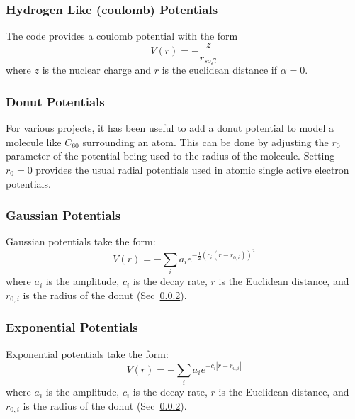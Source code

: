 \documentclass{article}
\begin{document}
\subsubsection{Hydrogen Like (coulomb) Potentials} %
\label{ssub:hydrogen_like}
The code provides a coulomb potential with the form
\begin{equation}
  V(r) = -\frac{z}{r_{soft}}
  \label{eq:H_like}
\end{equation}
where $z$ is the nuclear charge and $r$ is the euclidean distance if $\alpha = 0$.

\subsubsection{Donut Potentials} %
\label{ssub:donut_potentials}
For various projects, it has been useful to add a donut potential to model a molecule like $C_{60}$ surrounding an atom. This can be done by adjusting the $r_0$ parameter of the potential being used to the radius of the molecule. Setting $r_0=0$ provides the usual radial potentials used in atomic single active electron potentials.

\subsubsection{Gaussian Potentials} %
\label{ssub:gaussian_potentials}
Gaussian potentials take the form:
\begin{equation}
  V(r) = - \sum\limits_i a_i e^{-\frac{1}{2} (c_i (r-r_{0,i}))^2}
  \label{eq:gaussian}
\end{equation}
where $a_i$ is the amplitude, $c_i$ is the decay rate, $r$ is the Euclidean distance, and $r_{0,i}$ is the radius of the donut (Sec~\ref{ssub:donut_potentials}).

\subsubsection{Exponential Potentials} %
\label{ssub:exponential_potentials}
Exponential potentials take the form:
\begin{equation}
  V(r) = - \sum\limits_i a_i e^{-c_i |r-r_{0,i}|}
  \label{eq:exponential}
\end{equation}
where $a_i$ is the amplitude, $c_i$ is the decay rate, $r$ is the Euclidean distance, and $r_{0,i}$ is the radius of the donut (Sec~\ref{ssub:donut_potentials}).
\end{document}
